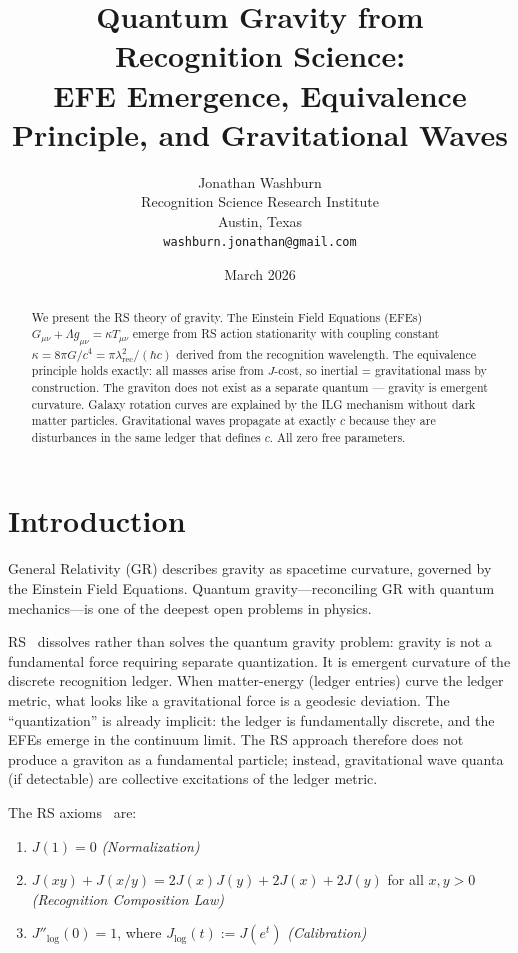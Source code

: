 \documentclass[12pt,a4paper]{article}
\title{Quantum Gravity from Recognition Science:\\
EFE Emergence, Equivalence Principle, and Gravitational Waves}
\author{Jonathan Washburn\\
Recognition Science Research Institute\\
Austin, Texas\\
\texttt{washburn.jonathan@gmail.com}}
\date{March 2026}
\theoremstyle{definition}
\theoremstyle{remark}
\begin{document}
\maketitle

\begin{abstract}
We present the RS theory of gravity. The Einstein Field Equations (EFEs) 
$G_{\mu\nu} + \Lambda g_{\mu\nu} = \kappa T_{\mu\nu}$ emerge from RS action stationarity 
with coupling constant $\kappa = 8\pi G/c^4 = \pi\lambda_\mathrm{rec}^2/(\hbar c)$ 
derived from the recognition wavelength. The equivalence principle holds exactly: 
all masses arise from $J$-cost, so inertial = gravitational mass by construction. 
The graviton does not exist as a separate quantum — gravity is emergent curvature. 
Galaxy rotation curves are explained by the ILG mechanism without dark matter particles. 
Gravitational waves propagate at exactly $c$ because they are disturbances in the 
same ledger that defines $c$. All zero free parameters.
\end{abstract}

\section{Introduction}
\label{sec:intro}

General Relativity (GR) describes gravity as spacetime curvature, governed by the
Einstein Field Equations.  Quantum gravity---reconciling GR with quantum
mechanics---is one of the deepest open problems in physics.

RS~\cite{RS_Axioms} dissolves rather than solves the quantum gravity problem:
gravity is not a fundamental force requiring separate quantization.  It is emergent
curvature of the discrete recognition ledger.  When matter-energy (ledger entries)
curve the ledger metric, what looks like a gravitational force is a geodesic deviation.
The ``quantization'' is already implicit: the ledger is fundamentally discrete, and
the EFEs emerge in the continuum limit.  The RS approach therefore does not produce
a graviton as a fundamental particle; instead, gravitational wave quanta (if
detectable) are collective excitations of the ledger metric.

The RS axioms~\cite{RS_Axioms} are:
\begin{enumerate}[label=(A\arabic*),nosep]
  \item $J(1) = 0$ \hfill\textit{(Normalization)}
  \item $J(xy) + J(x/y) = 2J(x)J(y) + 2J(x) + 2J(y)$ for all $x,y>0$
  \hfill\textit{(Recognition Composition Law)}
  \item $J''_{\log}(0) = 1$, where $J_{\log}(t) := J(e^t)$
  \hfill\textit{(Calibration)}
\end{enumerate}
\end{document}

